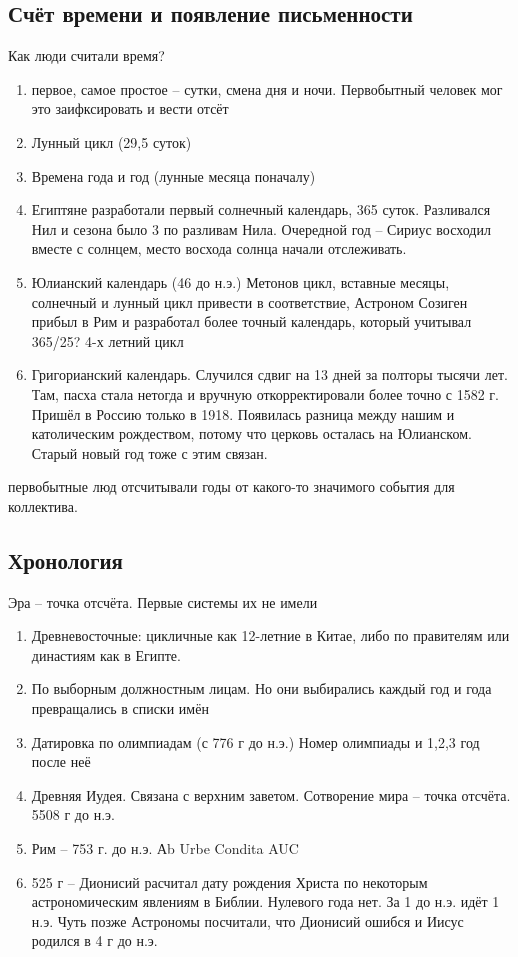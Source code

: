 \documentclass{book}
\theoremstyle{definition}
\begin{document}
    \subsection{Счёт времени и появление письменности}

    Как люди считали время? 


    \begin{enumerate}
        \item 
    первое, самое простое -- сутки, смена дня и ночи. Первобытный человек мог это заифксировать и вести отсёт 
\item Лунный цикл (29,5 суток)
\item Времена года и год (лунные месяца поначалу) 
\item Египтяне разработали первый солнечный календарь, 365 суток. Разливался Нил и сезона было 3 по разливам Нила. Очередной год -- Сириус восходил вместе с солнцем, место восхода солнца начали отслеживать.
\item Юлианский календарь (46 до н.э.) Метонов цикл, вставные месяцы, солнечный и лунный цикл привести в соответствие, Астроном Созиген прибыл в Рим и разработал более точный календарь, который учитывал 365/25? 4-х летний цикл
\item Григорианский календарь. Случился сдвиг на 13 дней за полторы тысячи лет. Там, пасха стала нетогда и вручную откорректировали более точно с 1582 г. Пришёл в Россию только в 1918. Появилась разница между нашим и католическим рождеством, потому что церковь осталась на Юлианском. Старый новый год тоже с этим связан.
    \end{enumerate}

    первобытные люд отсчитывали годы от какого-то значимого события для коллектива.

    \subsection{Хронология}

    Эра -- точка отсчёта. Первые системы их не имели
    \begin{enumerate}
        \item Древневосточные: цикличные как 12-летние в Китае, либо по правителям или династиям как в Египте.
        \item По выборным должностным лицам. Но они выбирались каждый год и года превращались в списки имён
        \item Датировка по олимпиадам (с 776 г до н.э.) Номер олимпиады и 1,2,3 год после неё
        \item Древняя Иудея. Связана с верхним заветом. Сотворение мира -- точка отсчёта. 5508 г до н.э.
        \item Рим -- 753 г. до н.э. Аb Urbe Condita AUC
        \item 525 г  -- Дионисий расчитал дату рождения Христа по некоторым астрономическим явлениям в Библии. Нулевого года нет. За 1 до н.э. идёт 1 н.э. Чуть позже Астрономы посчитали, что Дионисий ошибся и Иисус родился в 4 г до н.э.
    \end{enumerate}
\end{document}
